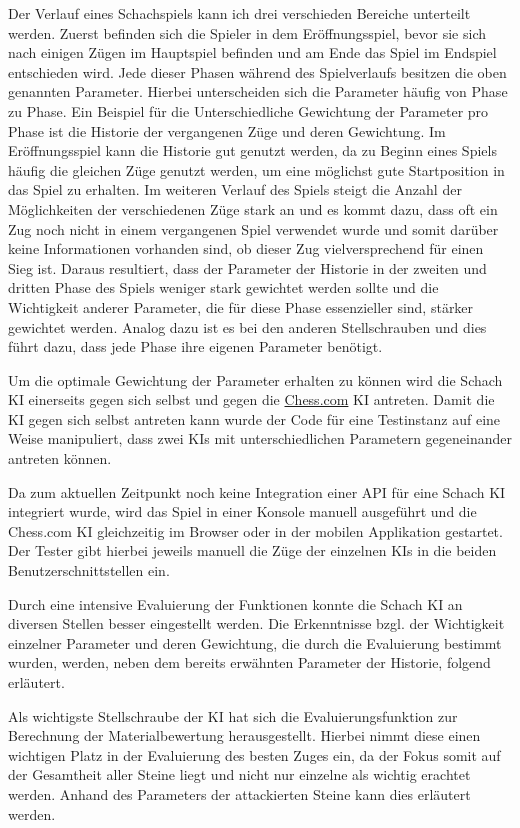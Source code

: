 Der Verlauf eines Schachspiels kann ich drei verschieden Bereiche unterteilt werden. Zuerst befinden sich die Spieler in dem Eröffnungsspiel, bevor sie sich nach einigen Zügen im Hauptspiel befinden und am Ende das Spiel im Endspiel entschieden wird. Jede dieser Phasen während des Spielverlaufs besitzen die oben genannten Parameter. Hierbei unterscheiden sich die Parameter häufig von Phase zu Phase. Ein Beispiel für die Unterschiedliche Gewichtung der Parameter pro Phase ist die Historie der vergangenen Züge und deren Gewichtung. Im Eröffnungsspiel kann die Historie gut genutzt werden, da zu Beginn eines Spiels häufig die gleichen Züge genutzt werden, um eine möglichst gute Startposition in das Spiel zu erhalten. Im weiteren Verlauf des Spiels steigt die Anzahl der Möglichkeiten der verschiedenen Züge stark an und es kommt dazu, dass oft ein Zug noch nicht in einem vergangenen Spiel verwendet wurde und somit darüber keine Informationen vorhanden sind, ob dieser Zug vielversprechend für einen Sieg ist. Daraus resultiert, dass der Parameter der Historie in der zweiten und dritten Phase des Spiels weniger stark gewichtet werden sollte und die Wichtigkeit anderer Parameter, die für diese Phase essenzieller sind, stärker gewichtet werden. Analog dazu ist es bei den anderen Stellschrauben und dies führt dazu, dass jede Phase ihre eigenen Parameter benötigt. 

Um die optimale Gewichtung der Parameter erhalten zu können wird die Schach KI einerseits gegen sich selbst und gegen die \href{https://www.chess.com}{Chess.com} KI antreten. Damit die KI gegen sich selbst antreten kann wurde der Code für eine Testinstanz auf eine Weise manipuliert, dass zwei KIs mit unterschiedlichen Parametern gegeneinander antreten können. 

Da zum aktuellen Zeitpunkt noch keine Integration einer API für eine Schach KI integriert wurde, wird das Spiel in einer Konsole manuell ausgeführt und die Chess.com KI gleichzeitig im Browser oder in der mobilen Applikation gestartet. Der Tester gibt hierbei jeweils manuell die Züge der einzelnen KIs in die beiden Benutzerschnittstellen ein.

Durch eine intensive Evaluierung der Funktionen konnte die Schach KI an diversen Stellen besser eingestellt werden. Die Erkenntnisse bzgl. der Wichtigkeit einzelner Parameter und deren Gewichtung, die durch die Evaluierung bestimmt wurden, werden, neben dem bereits erwähnten Parameter der Historie, folgend erläutert.

Als wichtigste Stellschraube der KI hat sich die Evaluierungsfunktion zur Berechnung der Materialbewertung herausgestellt. Hierbei nimmt diese einen wichtigen Platz in der Evaluierung des besten Zuges ein, da der Fokus somit auf der Gesamtheit aller Steine liegt und nicht nur einzelne als wichtig erachtet werden. Anhand des Parameters der attackierten Steine kann dies erläutert werden.

